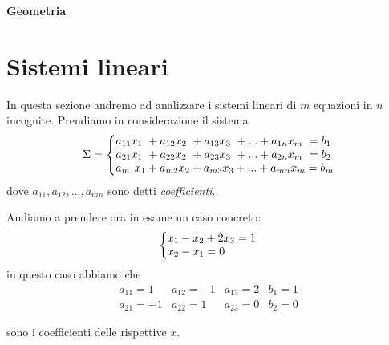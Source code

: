 \documentclass[a4paper]{article}
\makeatletter
\newenvironment{sistema}%
{\left\lbrace\begin{array}{{@{}l@{}l@{}l@{}l@{}}}}%
	{\end{array}\right.}
\newcommand{\ns}{\par \noindent}
\makeatother
\begin{document}
\newpage
\begin{center}
	{\LARGE \textbf{Geometria}}
\end{center}
\section[Geometria I: Sistemi Lineari]{Sistemi lineari}
In questa sezione andremo ad analizzare i sistemi lineari di $m$ equazioni in $n$ incognite. Prendiamo in considerazione il sistema
\begin{equation*}
	\Sigma = {
	\begin{sistema}
		a_{11} x_1 \ + a_{12} x_2\  + a_{13} x_3 \ + ...  + a_{1n} x_m \  = b_1 \\
		a_{21} x_1 \ + a_{22} x_2 \ + a_{23} x_3 \ + ... + a_{2n} x_m \  = b_2 \\
		a_{m1} x_1  + a_{m2} x_2 + a_{m3} x_3 + ... + a_{mn} x_m  = b_m
		
	\end{sistema}
}
\end{equation*}
dove $a_{11}, a_{12}, \dots , a_{mn}$ sono detti \textit{coefficienti}. 
\ns
Andiamo a prendere ora in esame un caso concreto:
 \begin{equation*}
 	\begin{sistema}
 		x_1 - x_2 +2x_3 = 1 \\
 		x_2 - x_1 = 0
 	\end{sistema}
 \end{equation*}
in questo caso abbiamo che
\begin{equation*}
	\begin{array}{lllll}
		a_{11}=1 & a_{12}= -1 & a_{13}=2 & b_1 = 1 \\
		a_{21}=-1 & a_{22}= 1 & a_{23}=0 & b_2 = 0
	\end{array}
\end{equation*}
\ns
sono i coefficienti delle rispettive $x$.
\end{document}
